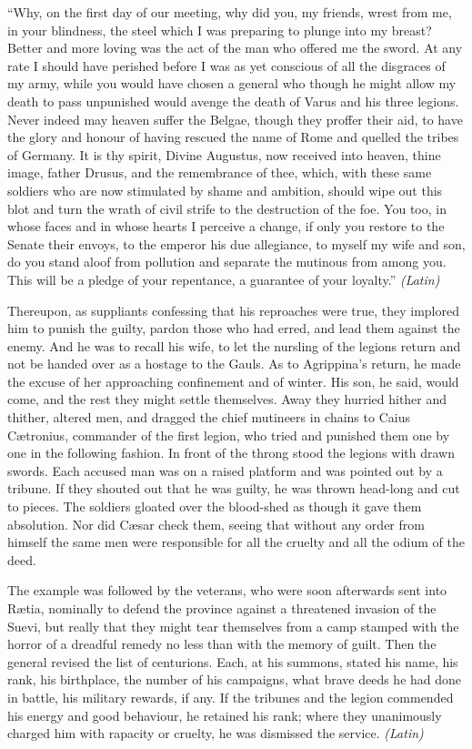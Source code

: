 ``Why, on the first day of our meeting, why did you, my friends, wrest from me, in your blindness, the steel which I was preparing to plunge into my breast? Better and more loving was the act of the man who offered me the sword. At any rate I should have perished before I was as yet conscious of all the disgraces of my army, while you would have chosen a general who though he might allow my death to pass unpunished would avenge the death of Varus and his three legions. Never indeed may heaven suffer the Belgae, though they proffer their aid, to have the glory and honour of having rescued the name of Rome and quelled the tribes of Germany. It is thy spirit, Divine Augustus, now received into heaven, thine image, father Drusus, and the remembrance of thee, which, with these same soldiers who are now stimulated by shame and ambition, should wipe out this blot and turn the wrath of civil strife to the destruction of the foe. You too, in whose faces and in whose hearts I perceive a change, if only you restore to the Senate their envoys, to the emperor his due allegiance, to myself my wife and son, do you stand aloof from pollution and separate the mutinous from among you. This will be a pledge of your repentance, a guarantee of your loyalty.'' \emph{(Latin)}


Thereupon, as suppliants confessing that his reproaches were true, they implored him to punish the guilty, pardon those who had erred, and lead them against the enemy. And he was to recall his wife, to let the nursling of the legions return and not be handed over as a hostage to the Gauls. As to Agrippina's return, he made the excuse of her approaching confinement and of winter. His son, he said, would come, and the rest they might settle themselves. Away they hurried hither and thither, altered men, and dragged the chief mutineers in chains to Caius Cætronius, commander of the first legion, who tried and punished them one by one in the following fashion. In front of the throng stood the legions with drawn swords. Each accused man was on a raised platform and was pointed out by a tribune. If they shouted out that he was guilty, he was thrown head-long and cut to pieces. The soldiers gloated over the blood-shed as though it gave them absolution. Nor did Cæsar check them, seeing that without any order from himself the same men were responsible for all the cruelty and all the odium of the deed.

The example was followed by the veterans, who were soon afterwards sent into Rætia, nominally to defend the province against a threatened invasion of the Suevi, but really that they might tear themselves from a camp stamped with the horror of a dreadful remedy no less than with the memory of guilt. Then the general revised the list of centurions. Each, at his summons, stated his name, his rank, his birthplace, the number of his campaigns, what brave deeds he had done in battle, his military rewards, if any. If the tribunes and the legion commended his energy and good behaviour, he retained his rank; where they unanimously charged him with rapacity or cruelty, he was dismissed the service. \emph{(Latin)}

